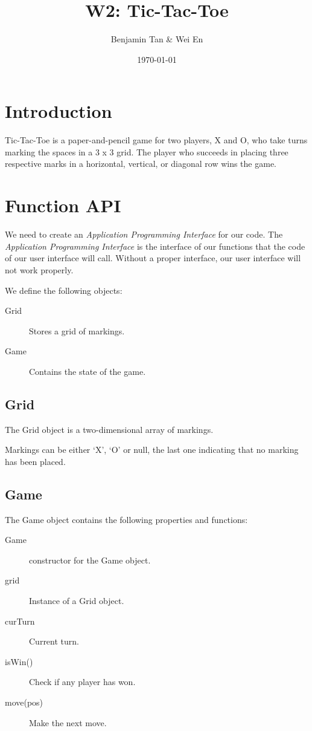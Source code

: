 \documentclass[a4paper]{article}
\title{W2: Tic-Tac-Toe}
\author{Benjamin Tan & Wei En}
\date{\today}
\begin{document}
\maketitle

\section{Introduction}

Tic-Tac-Toe is a paper-and-pencil game for two players, X and O, who take turns marking the spaces in a 3 x 3 grid. The player who succeeds in placing three respective marks in a horizontal, vertical, or diagonal row wins the game.

\section{Function API}

We need to create an \emph{Application Programming Interface} for our code. The \emph{Application Programming Interface} is the interface of our functions that the code of our user interface will call. Without a proper interface, our user interface will not work properly.

We define the following objects:

\begin{description}
  \item[Grid] Stores a grid of markings.
  \item[Game] Contains the state of the game.
\end{description}


\subsection{Grid}

The Grid object is a two-dimensional array of markings.

Markings can be either `X', `O' or null, the last one indicating that no marking has been placed.


\subsection{Game}

The Game object contains the following properties and functions:

\begin{description}
  \item[Game] constructor for the Game object.

  \item[grid] Instance of a Grid object.
  \item[curTurn] Current turn.

  \item[isWin()] Check if any player has won.
  \item[move(pos)] Make the next move.
\end{description}
\end{document}
